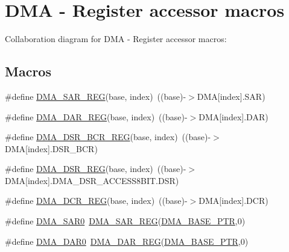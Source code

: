 \hypertarget{group___d_m_a___register___accessor___macros}{}\section{D\+MA -\/ Register accessor macros}
\label{group___d_m_a___register___accessor___macros}
Collaboration diagram for D\+MA -\/ Register accessor macros\+:
\subsection*{Macros}
\begin{DoxyCompactItemize}
\item 
\#define \hyperlink{group___d_m_a___register___accessor___macros_ga5e8089b8febb548b3b294eefc5ec71d1}{D\+M\+A\+\_\+\+S\+A\+R\+\_\+\+R\+EG}(base,  index)~((base)-\/$>$D\+MA\mbox{[}index\mbox{]}.S\+AR)
\item 
\#define \hyperlink{group___d_m_a___register___accessor___macros_ga89d9e3b09d60594f95d15b03c11d4e1e}{D\+M\+A\+\_\+\+D\+A\+R\+\_\+\+R\+EG}(base,  index)~((base)-\/$>$D\+MA\mbox{[}index\mbox{]}.D\+AR)
\item 
\#define \hyperlink{group___d_m_a___register___accessor___macros_gaa208e6c9ac3914ff9670b27aa2a6bd80}{D\+M\+A\+\_\+\+D\+S\+R\+\_\+\+B\+C\+R\+\_\+\+R\+EG}(base,  index)~((base)-\/$>$D\+MA\mbox{[}index\mbox{]}.D\+S\+R\+\_\+\+B\+CR)
\item 
\#define \hyperlink{group___d_m_a___register___accessor___macros_ga8917566774c0e389162780e01c2dfe57}{D\+M\+A\+\_\+\+D\+S\+R\+\_\+\+R\+EG}(base,  index)~((base)-\/$>$D\+MA\mbox{[}index\mbox{]}.D\+M\+A\+\_\+\+D\+S\+R\+\_\+\+A\+C\+C\+E\+S\+S8\+B\+I\+T.\+D\+SR)
\item 
\#define \hyperlink{group___d_m_a___register___accessor___macros_gae8a6edbedff5e645a72bea01af62b38b}{D\+M\+A\+\_\+\+D\+C\+R\+\_\+\+R\+EG}(base,  index)~((base)-\/$>$D\+MA\mbox{[}index\mbox{]}.D\+CR)
\item 
\#define \hyperlink{group___d_m_a___register___accessor___macros_ga6f8523733d96c977bb1be7b229f6f31e}{D\+M\+A\+\_\+\+S\+A\+R0}~\hyperlink{group___d_m_a___register___accessor___macros_ga5e8089b8febb548b3b294eefc5ec71d1}{D\+M\+A\+\_\+\+S\+A\+R\+\_\+\+R\+EG}(\hyperlink{group___d_m_a___peripheral_ga6997fbc1b1973e9f27170217a3bd6f22}{D\+M\+A\+\_\+\+B\+A\+S\+E\+\_\+\+P\+TR},0)
\item 
\#define \hyperlink{group___d_m_a___register___accessor___macros_gaead570256012035a8f2d34f11f29f715}{D\+M\+A\+\_\+\+D\+A\+R0}~\hyperlink{group___d_m_a___register___accessor___macros_ga89d9e3b09d60594f95d15b03c11d4e1e}{D\+M\+A\+\_\+\+D\+A\+R\+\_\+\+R\+EG}(\hyperlink{group___d_m_a___peripheral_ga6997fbc1b1973e9f27170217a3bd6f22}{D\+M\+A\+\_\+\+B\+A\+S\+E\+\_\+\+P\+TR},0)

\end{DoxyCompactItemize}
